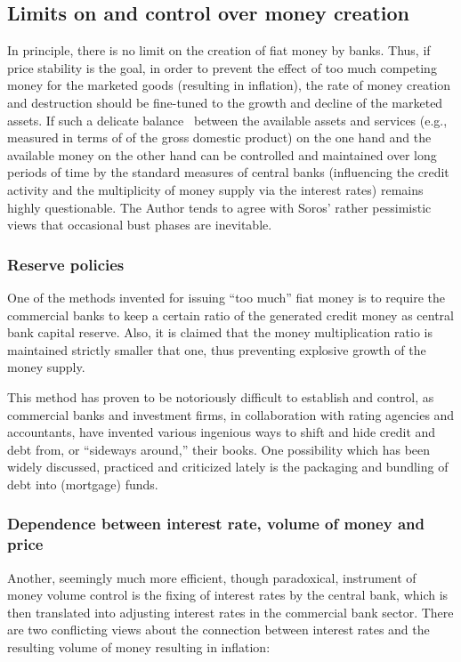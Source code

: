 \documentclass[aps,rmp,preprint,amsfonts,showpacs,showkeys]{revtex4}
\begin{document}
\subsection{Limits on and control over money creation}

In principle, there is no limit on the creation of fiat money by banks.
Thus, if price stability is the goal, in order to prevent the effect of too much competing money for the marketed goods (resulting in
inflation), the rate of money creation and destruction should be fine-tuned to the growth and decline of the marketed assets.
If such a delicate balance~\cite{2006-Binswanger}
between  the available assets and services (e.g., measured in terms of of the gross domestic product)
on the one hand and the available money on the other hand
can be controlled and maintained over long periods of time
by the standard measures of central banks (influencing the credit activity and the multiplicity of money supply via the interest rates)
remains highly questionable.
The Author tends to agree with Soros' rather pessimistic views \cite{soros-alchemy} that occasional bust phases are inevitable.

\subsubsection{Reserve policies}
One of the methods invented for issuing ``too much'' fiat money is to require the commercial banks to keep a certain ratio of the
generated credit money as central bank capital reserve.
Also, it is claimed that the money multiplication ratio is maintained strictly smaller that one, thus preventing
explosive growth of the money supply.

This method has proven to be notoriously difficult to establish and control, as commercial banks and
investment firms, in collaboration with rating agencies and accountants, have invented various ingenious ways
to shift and hide credit and debt from, or ``sideways around,'' their books.
One possibility which has been widely discussed, practiced and criticized lately is the packaging and bundling of debt
into (mortgage) funds.

\subsubsection{Dependence between interest rate, volume of money and price}


Another, seemingly much more efficient, though paradoxical,
instrument of money volume control is the fixing of interest rates by the central bank,
which is then translated into adjusting interest rates in the commercial bank sector.
There are two conflicting views about the connection between interest rates and the resulting volume of money
resulting in inflation:
\end{document}
